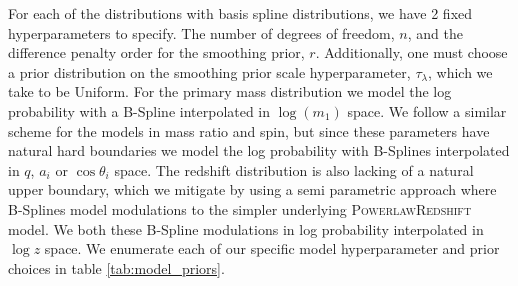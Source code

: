 For each of the distributions with basis spline distributions, we have 2 fixed hyperparameters to specify. The number of degrees of freedom, $n$, and the difference 
penalty order for the smoothing prior, $r$. Additionally, one must choose a prior distribution on the smoothing prior scale hyperparameter, $\tau_\lambda$, which we take to be Uniform. 
For the primary mass distribution we model the log probability with a B-Spline interpolated in $\log(m_1)$ space. We follow a similar scheme for the models in mass ratio and spin, but since 
these parameters have natural hard boundaries we model the log probability with B-Splines interpolated in $q$, $a_i$ or $\cos{\theta_i}$ space. The 
redshift distribution is also lacking of a natural upper boundary, which we mitigate by using a semi parametric approach where B-Splines model modulations to the 
simpler underlying \textsc{PowerlawRedshift} model. We both these B-Spline modulations in log probability interpolated in $\log z$ space. We enumerate each of our specific model hyperparameter 
and prior choices in table \ref{tab:model_priors}.